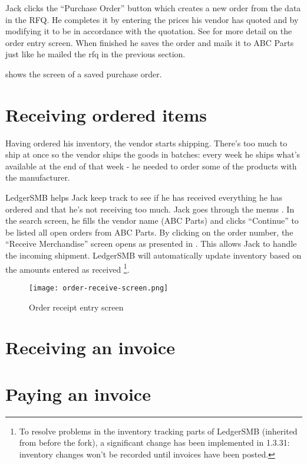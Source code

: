 Jack clicks the ``Purchase Order'' button which creates a new order from the data in the RFQ.
He completes it
by entering the prices his vendor has quoted and by modifying it to be in accordance with the
quotation. See  for more
detail on the order entry screen. When finished he saves the order and mails it to
ABC Parts just like he mailed the \gls{rfq} in the previous section.

 shows the screen of a saved purchase order.

\section{Receiving ordered items}
\label{sec-stock-receiving}

Having ordered his inventory, the vendor starts shipping. There's too much to ship at once
so the vendor ships the goods in batches: every week he ships what's available at the end
of that week - he needed to order some of the products with the manufacturer.

LedgerSMB helps Jack keep track to see if he has received everything he has ordered and
that he's not receiving too much. Jack goes through the menus .
In the search screen, he fills the vendor name (ABC Parts) and clicks ``Continue'' to be listed
all open orders from ABC Parts. By clicking on the order number, the ``Receive Merchandise'' screen
opens as presented in . This allows Jack to handle the incoming
shipment. LedgerSMB will automatically update inventory based on the amounts entered as received
\footnote{To resolve problems in the inventory tracking parts of LedgerSMB (inherited from
before the fork), a significant change has been implemented in 1.3.31: inventory changes won't
be recorded until invoices have been posted.
}.

\begin{figure}[h]
\centering
\texttt{[image: order-receive-screen.png]}
\caption{Order receipt entry screen}
\label{fig:order-receive-screen}
\end{figure}

\section{Receiving an invoice}
\label{sec-stock-invoice}



\section{Paying an invoice}
\label{sec-stock-payment}



